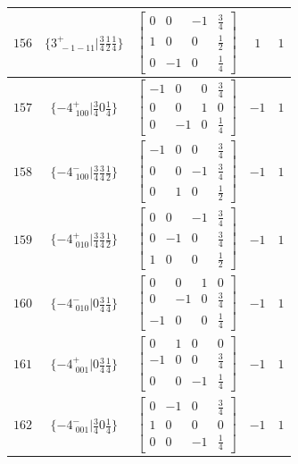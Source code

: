 \documentclass[fleqn,8pt]{jsarticle}
\begin{document}
\begin{longtable}{ccccc}
$ 156 $ & $ \{3^{+}_{\,\,-1-11}|\frac{3}{4} \frac{1}{2} \frac{1}{4}\} $ & $ \begin{bmatrix} 0 & 0 & -1 & \frac{3}{4} \\ 1 & 0 & 0 & \frac{1}{2} \\ 0 & -1 & 0 & \frac{1}{4} \end{bmatrix} $ & $ 1 $ & $ 1 $ \\ \hline
$ 157 $ & $ \{-4^{+}_{\,\,100}|\frac{3}{4} 0 \frac{1}{4}\} $ & $ \begin{bmatrix} -1 & 0 & 0 & \frac{3}{4} \\ 0 & 0 & 1 & 0 \\ 0 & -1 & 0 & \frac{1}{4} \end{bmatrix} $ & $ -1 $ & $ 1 $ \\ \hline
$ 158 $ & $ \{-4^{-}_{\,\,100}|\frac{3}{4} \frac{3}{4} \frac{1}{2}\} $ & $ \begin{bmatrix} -1 & 0 & 0 & \frac{3}{4} \\ 0 & 0 & -1 & \frac{3}{4} \\ 0 & 1 & 0 & \frac{1}{2} \end{bmatrix} $ & $ -1 $ & $ 1 $ \\ \hline
$ 159 $ & $ \{-4^{+}_{\,\,010}|\frac{3}{4} \frac{3}{4} \frac{1}{2}\} $ & $ \begin{bmatrix} 0 & 0 & -1 & \frac{3}{4} \\ 0 & -1 & 0 & \frac{3}{4} \\ 1 & 0 & 0 & \frac{1}{2} \end{bmatrix} $ & $ -1 $ & $ 1 $ \\ \hline
$ 160 $ & $ \{-4^{-}_{\,\,010}|0 \frac{3}{4} \frac{1}{4}\} $ & $ \begin{bmatrix} 0 & 0 & 1 & 0 \\ 0 & -1 & 0 & \frac{3}{4} \\ -1 & 0 & 0 & \frac{1}{4} \end{bmatrix} $ & $ -1 $ & $ 1 $ \\ \hline
$ 161 $ & $ \{-4^{+}_{\,\,001}|0 \frac{3}{4} \frac{1}{4}\} $ & $ \begin{bmatrix} 0 & 1 & 0 & 0 \\ -1 & 0 & 0 & \frac{3}{4} \\ 0 & 0 & -1 & \frac{1}{4} \end{bmatrix} $ & $ -1 $ & $ 1 $ \\ \hline
$ 162 $ & $ \{-4^{-}_{\,\,001}|\frac{3}{4} 0 \frac{1}{4}\} $ & $ \begin{bmatrix} 0 & -1 & 0 & \frac{3}{4} \\ 1 & 0 & 0 & 0 \\ 0 & 0 & -1 & \frac{1}{4} \end{bmatrix} $ & $ -1 $ & $ 1 $ \\ \hline

\end{longtable}
\end{document}
